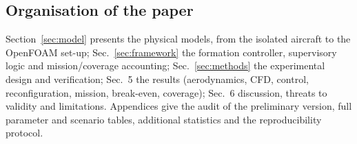 \subsection{Organisation of the paper}
Section~\ref{sec:model} presents the physical models, from the isolated aircraft to the OpenFOAM set-up; Sec.~\ref{sec:framework} the formation controller, supervisory logic and mission/coverage accounting; Sec.~\ref{sec:methods} the experimental design and verification; Sec.~5 the results (aerodynamics, CFD, control, reconfiguration, mission, break-even, coverage); Sec.~6 discussion, threats to validity and limitations. Appendices give the audit of the preliminary version, full parameter and scenario tables, additional statistics and the reproducibility protocol.

